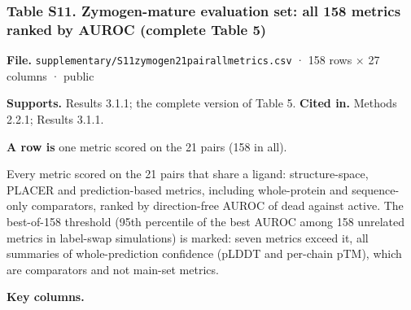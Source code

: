 \documentclass[
  10pt,
]{article}
\DeclareRobustCommand{\_}{\textunderscore\hspace{0pt}}
\begin{document}
\hypertarget{S11}{%
\subsubsection{Table
S11. Zymogen-mature
evaluation set: all
158 metrics ranked
by AUROC (complete
Table
5)}\label{S11}}

\begin{shaded}\small

\textbf{File.}
\texttt{supplementary/S11\_zymogen\_21pair\_all\_metrics.csv}
· 158 rows × 27
columns · public

\textbf{Supports.}
Results 3.1.1; the
complete version of
Table 5.
\textbf{Cited in.}
Methods 2.2.1;
Results 3.1.1.

\textbf{A row is}
one metric scored on
the 21 pairs (158 in
all).

\end{shaded}

Every metric scored
on the 21 pairs that
share a ligand:
structure-space,
PLACER and
prediction-based
metrics, including
whole-protein and
sequence-only
comparators, ranked
by direction-free
AUROC of dead
against active. The
best-of-158
threshold (95th
percentile of the
best AUROC among 158
unrelated metrics in
label-swap
simulations) is
marked: seven
metrics exceed it,
all summaries of
whole-prediction
confidence (pLDDT
and per-chain pTM),
which are
comparators and not
main-set metrics.

\textbf{Key
columns.}
\end{document}
